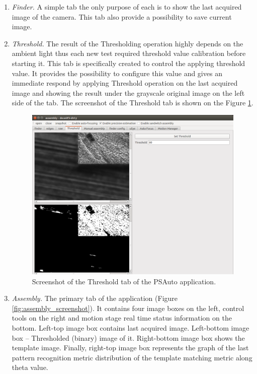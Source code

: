 \begin{enumerate}

\item \emph{Finder.} A simple tab the only purpose of each is to show the last acquired image of the camera. This tab also provide a possibility to save current image.

\item \emph{Threshold.} The result of the Thresholding operation highly depends on the ambient light thus each new test required threshold value calibration before starting it. This tab is specifically created to control the applying threshold value. It provides the possibility to configure this value and gives an immediate respond by applying Threshold operation on the last acquired image and showing the result under the grayscale original image on the left side of the tab. The screenshot of the Threshold tab is shown on the Figure \ref{fig:threshold_screenshot}.

\begin{figure}[ht]\centering
\includegraphics[width=0.7\linewidth]{Data/Control_Software/Threshold_screenshot.png}
\caption{Screenshot of the Threshold tab of the PSAuto application.}
\label{fig:threshold_screenshot}
\end{figure}

\item \emph{Assembly.} The primary tab of the application (Figure \ref{fig:assembly_screenshot}). It contains four image boxes on the left, control tools on the right and motion stage real time status information on the bottom. Left-top image box contains last acquired image. Left-bottom image box -- Thresholded (binary) image of it. Right-bottom image box shows the template image. Finally, right-top image box represents the graph of the last pattern recognition metric distribution of the template matching metric along theta value.


\end{enumerate}

